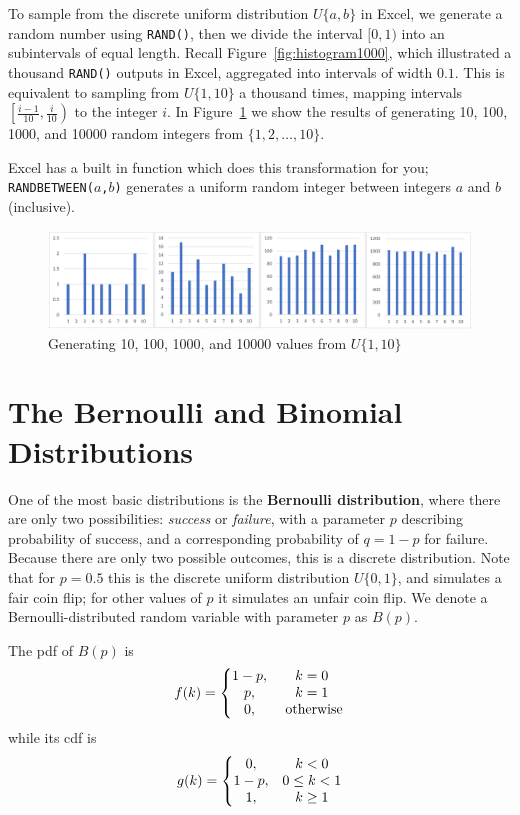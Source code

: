 To sample from the discrete uniform distribution $U\{a,b\}$ in Excel, we generate a random number using \texttt{RAND()}, then we divide the interval $[0,1)$ into an subintervals of equal length.
Recall Figure~\ref{fig:histogram1000}, which illustrated a thousand \texttt{RAND()} outputs in Excel, aggregated into intervals of width $0.1$.
This is equivalent to sampling from $U\{1,10\}$ a thousand times, mapping intervals $\left[\frac{i-1}{10},\frac{i}{10}\right)$ to the integer $i$.
In Figure~\ref{fig:2_histogram_uniform} we show the results of generating 10, 100, 1000, and 10000 random integers from $\{1,2,\ldots,10\}$.

Excel has a built in function which does this transformation for you; \texttt{RANDBETWEEN($a$,$b$)} generates a uniform random integer between integers $a$ and $b$ (inclusive).

\begin{figure}[htbp]
	\centering
	\includegraphics[width=\textwidth]{fig/2_histogram_uniform.png}
	\caption{Generating 10, 100, 1000, and 10000 values from $U\{1,10\}$ \label{fig:2_histogram_uniform}}
\end{figure}


\newpage

\section{The Bernoulli and Binomial Distributions}\label{sec2:binomial}

One of the most basic distributions is the \textbf{Bernoulli distribution}, where there are only two possibilities: \emph{success} or \emph{failure}, with a parameter $p$ describing probability of success, and a corresponding probability of $q = 1-p$ for failure.
Because there are only two possible outcomes, this is a discrete distribution.
Note that for $p = 0.5$ this is the discrete uniform distribution $U\{0,1\}$, and simulates a fair coin flip; for other values of $p$ it simulates an unfair coin flip.
We denote a Bernoulli-distributed random variable with parameter $p$ as $B(p)$.

The pdf of $B(p)$ is \[ f(k) = \left\{ \begin{matrix} 1-p, & k = 0 \cr p, & k = 1 \cr 0, & \text{ otherwise} \end{matrix} \right. \]
while its cdf is \[ g(k) = \left\{ \begin{matrix} 0, & k < 0 \cr 1-p, & 0 \leq k < 1 \cr 1, & k \geq 1 \end{matrix} \right. \]

